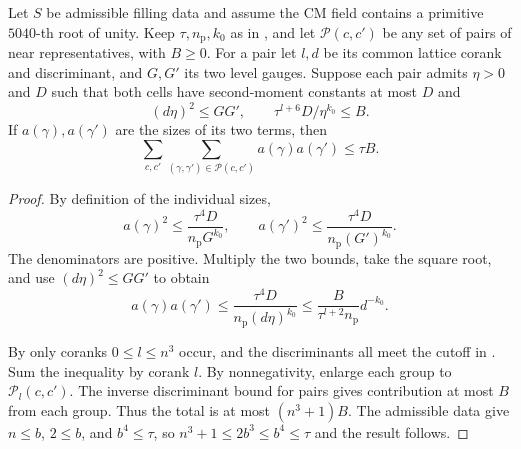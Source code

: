 \begin{lemma}
\label{lem:b-weighted-near-pairs}
\emitthmsource
Let $S$ be admissible filling data and assume the CM field contains a primitive $5040$-th root of unity.
Keep $\tau,n_{\mathrm p},k_0$ as in ,
and let $\mathcal P(c,c')$ be any set of pairs of near representatives, with $B\ge0$.
For a pair let $l,d$ be its common lattice corank and discriminant, and $G,G'$ its two level gauges.
Suppose each pair admits $\eta>0$ and $D$ such that both cells have second-moment constants at most $D$ and
\[
   (d\eta)^2\le GG',\qquad \tau^{l+6}D/\eta^{k_0}\le B.
\]
If $a(\gamma),a(\gamma')$ are the sizes of its two terms, then
\[
  \sum_{c,c'}\sum_{(\gamma,\gamma')\in\mathcal P(c,c')}
        a(\gamma)a(\gamma')\le \tau B.
\]
\end{lemma}
\begin{proof}
By definition of the individual sizes,
\[
   a(\gamma)^2\le \frac{\tau^4 D}{n_{\mathrm p}G^{k_0}},
   \qquad
   a(\gamma')^2\le \frac{\tau^4 D}{n_{\mathrm p}(G')^{k_0}} .
\]
The denominators are positive. Multiply the two bounds, take the square root, and use $(d\eta)^2\le GG'$ to obtain
\[
  a(\gamma)a(\gamma')\le
  \frac{\tau^4 D}{n_{\mathrm p}(d\eta)^{k_0}}
  \le \frac{B}{\tau^{l+2}n_{\mathrm p}}d^{-k_0}.
\]

By  only coranks $0\le l\le n^3$ occur,
and the discriminants all meet the cutoff in .
Sum the inequality by corank $l$. By nonnegativity, enlarge each group to $\mathcal P_l(c,c')$.
The inverse discriminant bound for pairs gives contribution at most $B$ from each group.
Thus the total is at most $(n^3+1)B$.
The admissible data give $n\le b$, $2\le b$, and $b^4\le\tau$,
so $n^3+1\le 2b^3\le b^4\le\tau$ and the result follows.
\end{proof}

